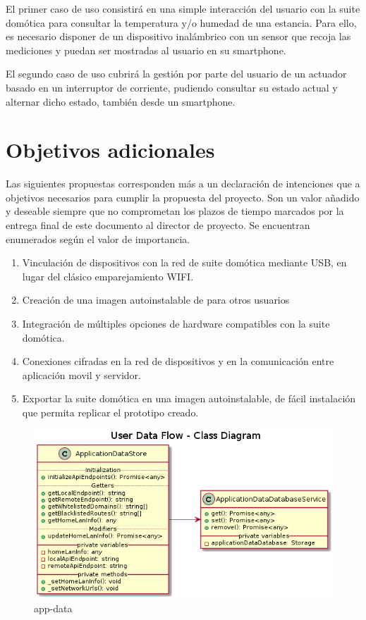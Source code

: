 El primer caso de uso consistirá en una simple interacción del usuario con la suite domótica para consultar la temperatura y/o humedad de una estancia. Para ello, es necesario disponer de un dispositivo inalámbrico con un sensor que recoja las mediciones y puedan ser mostradas al usuario en su smartphone.

El segundo caso de uso cubrirá la gestión por parte del usuario de un actuador basado en un interruptor de corriente, pudiendo consultar su estado actual y alternar dicho estado, también desde un smartphone.

\section{Objetivos adicionales}
\label{ch:Capitulo3.6}

Las siguientes propuestas corresponden más a un declaración de intenciones que a objetivos necesarios para cumplir la propuesta del proyecto. Son un valor añadido y deseable siempre que no comprometan los plazos de tiempo marcados por la entrega final de este documento al director de proyecto. Se encuentran enumerados según el valor de importancia.

\begin{enumerate}

  \item Vinculación de dispositivos con la red de suite domótica mediante USB, en lugar del clásico emparejamiento WIFI.

  \item Creación de una imagen autoinstalable de para otros usuarios

  \item Integración de múltiples opciones de hardware compatibles con la suite domótica.

  \item Conexiones cifradas en la red de dispositivos y en la comunicación entre aplicación movil y servidor.

  \item Exportar la suite domótica en una imagen autoinstalable, de fácil instalación que permita replicar el prototipo creado.

\end{enumerate}


\begin{figure}[hbt!]
\centering
\includegraphics[height=2.5in]{figures/diagrams/front/data-flow/app-data.png}
\caption[app-data]{app-data\footnotemark}
\end{figure}

